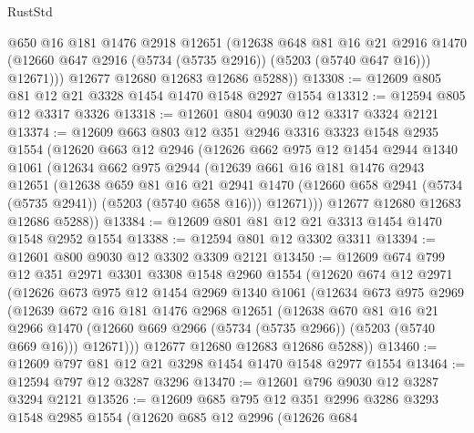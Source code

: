 \begin{lexlean}{RustStd}
\begin{coremodule}
            @650
            @16
            @181
            @1476
            @2918
            @12651
            (@12638
              @648
              @81
              @16
              @21
              @2916
              @1470
              (@12660 @647 @2916 (@5734 (@5735 @2916)) (@5203 (@5740 @647 @16)))
              @12671)))
        @12677
        @12680
        @12683
        @12686
        @5288))
@13308 := @12609 @805 @81 @12 @21 @3328 @1454 @1470 @1548 @2927 @1554
@13312 := @12594 @805 @12 @3317 @3326
@13318 := @12601 @804 @9030 @12 @3317 @3324 @2121
@13374 := @12609
    @663
    @803
    @12
    @351
    @2946
    @3316
    @3323
    @1548
    @2935
    @1554
    (@12620
      @663
      @12
      @2946
      (@12626
        @662
        @975
        @12
        @1454
        @2944
        @1340
        @1061
        (@12634
          @662
          @975
          @2944
          (@12639
            @661
            @16
            @181
            @1476
            @2943
            @12651
            (@12638
              @659
              @81
              @16
              @21
              @2941
              @1470
              (@12660 @658 @2941 (@5734 (@5735 @2941)) (@5203 (@5740 @658 @16)))
              @12671)))
        @12677
        @12680
        @12683
        @12686
        @5288))
@13384 := @12609 @801 @81 @12 @21 @3313 @1454 @1470 @1548 @2952 @1554
@13388 := @12594 @801 @12 @3302 @3311
@13394 := @12601 @800 @9030 @12 @3302 @3309 @2121
@13450 := @12609
    @674
    @799
    @12
    @351
    @2971
    @3301
    @3308
    @1548
    @2960
    @1554
    (@12620
      @674
      @12
      @2971
      (@12626
        @673
        @975
        @12
        @1454
        @2969
        @1340
        @1061
        (@12634
          @673
          @975
          @2969
          (@12639
            @672
            @16
            @181
            @1476
            @2968
            @12651
            (@12638
              @670
              @81
              @16
              @21
              @2966
              @1470
              (@12660 @669 @2966 (@5734 (@5735 @2966)) (@5203 (@5740 @669 @16)))
              @12671)))
        @12677
        @12680
        @12683
        @12686
        @5288))
@13460 := @12609 @797 @81 @12 @21 @3298 @1454 @1470 @1548 @2977 @1554
@13464 := @12594 @797 @12 @3287 @3296
@13470 := @12601 @796 @9030 @12 @3287 @3294 @2121
@13526 := @12609
    @685
    @795
    @12
    @351
    @2996
    @3286
    @3293
    @1548
    @2985
    @1554
    (@12620
      @685
      @12
      @2996
      (@12626
        @684

\end{coremodule}
\end{lexlean}

